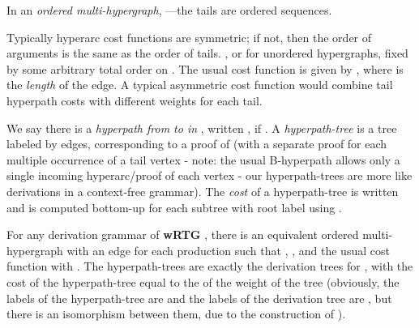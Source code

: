 \documentclass[english]{article}
\newcommand\comment[1]{}
\newcommand{\nth}[2]{#1\textsuperscript{\textit{#2}}}
\newcommand\cls[1]{\textbf{#1}}
\begin{document}
\comment{For a \emph{multi-hypergraph}, ---the tails are a
  multiset of vertices.  } In an \emph{ordered multi-hypergraph},
  ---the tails are ordered sequences.

  Typically hyperarc cost functions are symmetric; if not, then the order of
  arguments is the same as the order of tails.
, or for unordered hypergraphs,  fixed by some arbitrary total order  on .
  The usual cost function
  is given by , where 
  is the \emph{length} of the edge.  A typical asymmetric cost function would
  combine tail hyperpath costs with different weights for each tail.

  We say there is a \emph{hyperpath from  to  in
  }, written , if .  A \emph{hyperpath-tree
  } is a tree labeled by edges, corresponding to a proof
  of  (with a separate proof for each multiple occurrence of a
  tail vertex - note: the usual B-hyperpath allows only a single incoming
  hyperarc/proof of each vertex - our hyperpath-trees are more like derivations
  in a context-free grammar).  The \emph{cost} of a hyperpath-tree  is
  written  and is computed bottom-up for each subtree with root label 
  using .

\comment{
  The hyperpath-trees of an ordered multi-hypergraph are ordered trees () with subtree
   giving the proof used for the \nth{i}{th} tail, while the
  hyperpath-trees of an unordered (multi-)hypergraph are unordered () trees.  For
  each node in a hyperpath-tree with edge label , there is exactly one child subtree for each
  instance of a tail , with root edge label  having the same head
  .

  There is a many-to-one cost-preserving correspondence between hyperpath-trees in an
  ordered multi-hypergraph  and a derived multi-hypergraph 
  with  (by interpreting the tails as multisets instead of sequences).  Each
  unordered hyperpath-tree  describes a set 
  of unique equivalent
  ordered hyperpath-trees in ---
  essentially (recursively) all permutations of ,
  but with the child root edge dictating which tail positions it can attach to
  ().

  Another way to look at this is that we can
  specify the ordered child index  as being the \nth{n}{th} least having
  corresponding to the tail vertex .  That is, for an ordered
  hyperarc  with ,  gives the location of a particular
  instance of a tail.

  We can compute  but need to check for identical
  subtrees in order to not count their inversion twice (this is done implicitly by
  iterating over unique items in the multiset ):
  
}
  For any derivation grammar  of \cls{wRTG} ,
  there is an equivalent ordered multi-hypergraph  with an edge 
  for each production  such that ,
  , and the usual
  cost function with .  The hyperpath-trees  are exactly
  the derivation trees for , with the cost of the hyperpath-tree equal to the 
  of the weight of the tree (obviously, the labels of the hyperpath-tree are
   and the labels of the derivation tree are , but there is an
  isomorphism between them, due to the construction of ).
\end{document}
